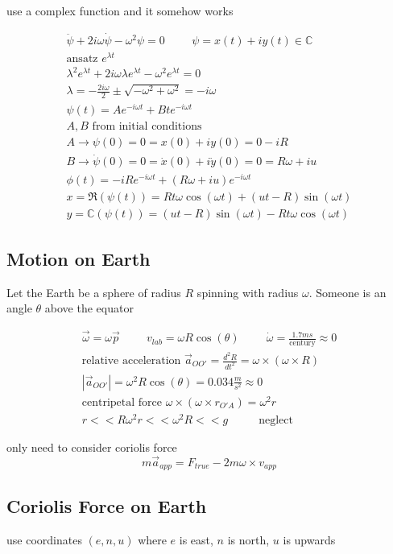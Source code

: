 \documentclass[fleqn]{report}
\newcommand{\hp}{\hspace{1cm}}
\newcommand{\equations} [1] {
\begin{gather*}
#1
\end{gather*}
}
\begin{document}
use a complex function and it somehow works 
%
\equations{
    \ddot \psi + 2 i \omega \dot \psi - \omega^2 \psi = 0
    \hp
    \psi = x(t) + i y(t) \in \mathbb C
    \\
    \textrm{ansatz $e^{\lambda t}$}
    \\
    \lambda^2 e^{\lambda t} + 2 i \omega \lambda e^{\lambda t} 
    - \omega^2 e^{\lambda t} = 0
    \\
    \lambda = - \frac{2 i \omega}{2} \pm \sqrt{- \omega^2 + \omega^2} = - i \omega 
    \\
    \psi(t) = A e^{- i \omega t} + Bt e^{- i \omega t}
    \\
    \textrm{$A, B$ from initial conditions}
    \\
    A \rightarrow \psi(0) = 0 = x(0) + i y(0) = 0 - iR
    \\
    B \rightarrow \dot \psi(0) = 0 = \dot x(0) + i \dot y(0) = 0 = R \omega + iu
    \\
    \phi(t) = - i R e^{- i \omega t} + (R \omega + iu) e^{- i \omega t}
    \\
    x = \Re (\psi(t)) = R t \omega \cos(\omega t) + (ut - R) \sin(\omega t)
    \\
    y = \mathbb C (\psi (t)) = 
    (ut - R) \sin(\omega t) - Rt \omega \cos(\omega t)
}


\subsection{Motion on Earth}
Let the Earth be a sphere of radius $R$ spinning with radius $\omega$. 
Someone is an angle $\theta$ above the equator

\equations{
    \vec \omega = \omega \vec p 
    \hp
    v_{lab} =  \omega R \cos(\theta)
    \hp 
    \dot \omega = \frac{1.7 ms}{\textrm{century}}
    \approx 0
    \\
    \textrm{relative acceleration } 
    \vec a_{O O'} = \frac{d^2 R}{dt^2} = \omega \times (\omega \times R)
    \\
    |\vec a_{O O'}| = \omega^2 R \cos(\theta)
    =
    0.034 \frac{m}{s^2} \approx 0
    \\
    \textrm{centripetal force } \omega \times (\omega \times r_{O' A}) = \omega^2 r
    \\
    r << R
    \omega^2 r << \omega^2 R << g \hp \textrm{ neglect }
}
only need to consider coriolis force 
\[
m \vec a_{app} = F_{true} - 2 m \omega \times v_{app}
\]

\subsection{Coriolis Force on Earth}
use coordinates $(e, n, u)$ where $e$ is east, $n$ is north, $u$ is upwards 
\end{document}
